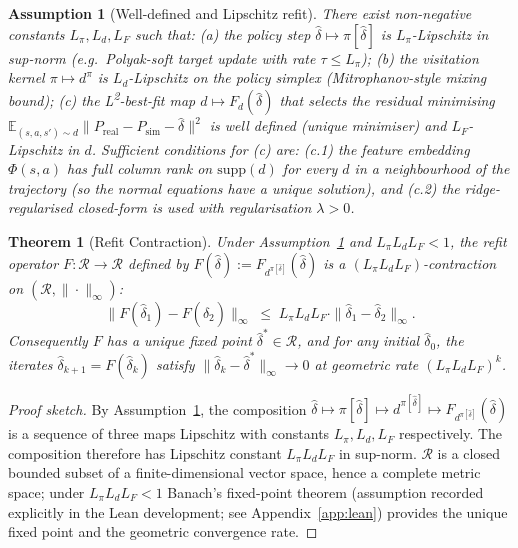 \documentclass{article}
\newtheorem{theorem}{Theorem}
\newtheorem{assumption}{Assumption}
\theoremstyle{definition}
\newcommand{\Psim}{P_{\mathrm{sim}}}
\newcommand{\Preal}{P_{\mathrm{real}}}
\newcommand{\supp}{\mathrm{supp}}
\begin{document}
\begin{assumption}[Well-defined and Lipschitz refit]
\label{assm:refit-lip}
There exist non-negative constants $L_\pi, L_d, L_F$ such that:
(a) the policy step $\hat\delta\mapsto\pi[\hat\delta]$ is $L_\pi$-Lipschitz
in sup-norm (e.g.\ Polyak-soft target update with rate $\tau\le L_\pi$);
(b) the visitation kernel $\pi\mapsto d^\pi$ is $L_d$-Lipschitz on the
policy simplex (Mitrophanov-style mixing bound);
(c) the L\textsuperscript{2}-best-fit map $d\mapsto F_d(\hat\delta)$
that selects the residual minimising
$\mathbb E_{(s,a,s')\sim d}\|\Preal-\Psim-\hat\delta\|^2$ is well defined
(unique minimiser) and $L_F$-Lipschitz in $d$.  Sufficient conditions for
(c) are: (c.1) the feature embedding $\Phi(s,a)$ has full column rank
on $\supp(d)$ for every $d$ in a neighbourhood of the trajectory (so
the normal equations have a unique solution), and (c.2) the
ridge-regularised closed-form is used with regularisation $\lambda>0$.
\end{assumption}

\begin{theorem}[Refit Contraction]
\label{thm:refit-contraction}
Under Assumption~\ref{assm:refit-lip} and $L_\pi L_d L_F < 1$, the refit
operator $F : \mathcal R\to\mathcal R$ defined by
$F(\hat\delta) := F_{d^{\pi[\hat\delta]}}(\hat\delta)$ is a
$(L_\pi L_d L_F)$-contraction on $(\mathcal R,\|\cdot\|_\infty)$:
\[
\|F(\hat\delta_1) - F(\hat\delta_2)\|_\infty
\;\le\; L_\pi L_d L_F\cdot \|\hat\delta_1 - \hat\delta_2\|_\infty.
\]
Consequently $F$ has a unique fixed point $\hat\delta^*\in\mathcal{R}$,
and for any initial $\hat\delta_0$, the iterates
$\hat\delta_{k+1} = F(\hat\delta_k)$ satisfy
$\|\hat\delta_k - \hat\delta^*\|_\infty \to 0$ at geometric rate
$(L_\pi L_d L_F)^k$.
\end{theorem}

\begin{proof}[Proof sketch]
By Assumption~\ref{assm:refit-lip}, the composition
$\hat\delta \mapsto \pi[\hat\delta] \mapsto d^{\pi[\hat\delta]}
\mapsto F_{d^{\pi[\hat\delta]}}(\hat\delta)$ is a sequence of three
maps Lipschitz with constants $L_\pi, L_d, L_F$ respectively.  The
composition therefore has Lipschitz constant $L_\pi L_d L_F$ in
sup-norm.  $\mathcal{R}$ is a closed bounded subset of a
finite-dimensional vector space, hence a complete metric space; under
$L_\pi L_d L_F < 1$ Banach's fixed-point theorem (assumption recorded
explicitly in the Lean development; see Appendix~\ref{app:lean})
provides the unique fixed point and the geometric convergence rate.
\end{proof}
\end{document}

